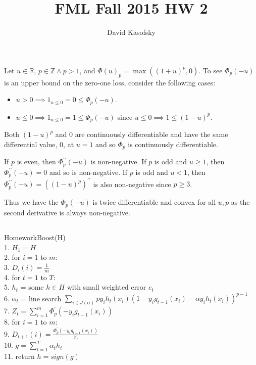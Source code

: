 \documentclass[]{article}
\title{FML Fall 2015 HW 2}
\author{David Kasofsky}
\begin{document}
\section{}
\subsection{}

Let $u \in \mathbb{R}$, $p \in \mathbb{Z} \land p > 1$, and $\Phi(u)_p = \max((1+u)^p, 0)$. To see $\Phi_p(-u)$ is an upper bound on the zero-one loss, consider the following cases:

\begin{itemize}
\item $u > 0 \implies 1_{u \le 0} = 0 \le \Phi_p(-u)$.
\item $u \le 0 \implies 1_{u \le 0} = 1 \le \Phi_p(-u)$ since $u \le 0 \implies 1 \le (1-u)^p$.
\end{itemize}

\noindent Both $(1-u)^p$ and 0 are continuously differentiable and have the same differential value, 0, at $u = 1$ and so $\Phi_p$ is continuously differentiable.

If $p$ is even, then $\Phi_p^{\prime \prime}(-u)$ is non-negative. If $p$ is odd and $u \ge 1$, then $\Phi_p^{\prime \prime}(-u) = 0$ and so is non-negative. If $p$ is odd and $u < 1$, then $\Phi_p^{\prime \prime}(-u)  = ((1-u)^p)^{\prime \prime}$ is also non-negative since $p \ge 3$.

Thus we have the $\Phi_p(-u)$ is twice differentiable and convex for all $u, p$ as the second derivative is always non-negative.

\subsection{}

\noindent HomeworkBoost(H)\\
1. $ H_1 = H$\\
2. for $i = 1$ to $m$:\\
3. \indent $D_i(i) = \frac{1}{m}$\\
4. for $t = 1$ to $T$:\\
5. \indent $h_t$ = some $h \in H$ with small weighted error $e_t$\\
6. \indent $\alpha_t$ = line search $\sum_{i \in J(\alpha)} p y_i h_t(x_i)(1 - y_i g_{t-1}(x_i) - \alpha y_i h_t(x_i))^{p-1}$\\
7. \indent $Z_t = \sum_{i=1}^{m}\Phi_p^\prime(-y_i g_{t-1}(x_i))$\\
8. \indent for $i =1$ to $m$:\\
9. \indent \indent $D_{t+1}(i) = \frac{\Phi_p^\prime(-y_i g_{t-1}(x_i))}{Z_t}$\\
10. $g = \sum_{t=1}^{T} \alpha_t h_t$\\
11. return $h = sign(g)$\\
\end{document}
